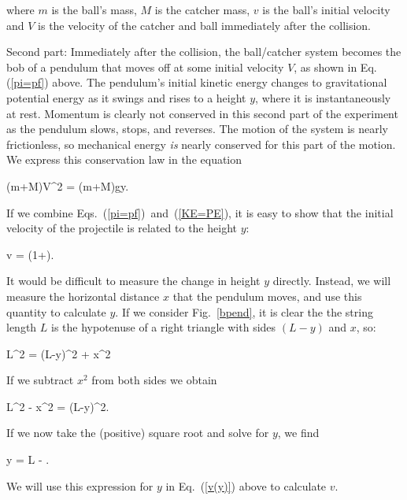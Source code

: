 where $m$ is the ball's mass, $M$ is the catcher mass, $v$ is the
ball's initial velocity and $V$ is the velocity of the catcher and
ball immediately after the collision.

Second part:  Immediately after the collision, the ball/catcher system
becomes the bob of a pendulum that moves off at some initial velocity
$V$, as shown in Eq.(\ref{pi=pf}) above. The pendulum's initial
kinetic energy changes to gravitational
potential energy as it swings and rises to a height $y$, where it is
instantaneously at rest. Momentum is clearly not
conserved in this second part of the experiment as the
pendulum slows, stops, and reverses. The motion
of the system is nearly frictionless, so mechanical energy {\it is} nearly
conserved for this part of the motion.  We express this conservation
law in the equation

\beq
{}(m+M)V^{2} = (m+M)gy. \label{KE=PE}
\eeq

If we combine Eqs.~(\ref{pi=pf})~and~(\ref{KE=PE}), it is easy to
show that the initial velocity of the projectile is related to the
height $y$:

\beq
v = \left(1+\right). \label{v(y)}
\eeq

It would be difficult to measure the change in height $y$ directly.
Instead, we will measure the horizontal distance $x$ that the pendulum
moves, and use this quantity to calculate $y$.  If we consider
Fig.~\ref{bpend}, it is clear the the string length $L$ is
the hypotenuse of a right triangle with sides $(L-y)$ and $x$, so:


\beq
L^2 = (L-y)^2 + x^2
\eeq

If we subtract $x^2$ from both sides we obtain

\beq
L^2 - x^2 = (L-y)^2.
\eeq

If we now take the (positive) square root and solve for $y$,
we find

\beq
y = L - . \label{y(xL)}
\eeq

We will use this expression for $y$ in Eq.~(\ref{v(y)}) above to
calculate $v$.

